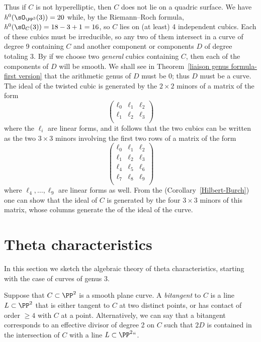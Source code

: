Thus if $C$ is not hyperelliptic, then $C$ does not lie on a quadric
surface. We have $h^0(\sO_{\PP^3}(3)) = 20$ while, by the Riemann--Roch
formula, $h^0(\sO_C(3)) = 18-3+1= 16$, so $C$ lies on (at least) 4
independent cubics. Each of these cubics must be irreducible, so any
two of them
intersect in a curve of degree 9 containing $C$ and another component
or components $D$ of degree totaling 3. By
%
if we choose two \emph{general} cubics containing $C$, then each of the
components of $D$ will be smooth. We shall see in
Theorem~\ref{liaison genus formula-first version}
that the arithmetic genus of $D$ must be 0;
thus $D$ must be a
%
 curve. The ideal of the twisted cubic
is generated by the $2\times 2$ minors of a matrix of the form
$$
\begin{pmatrix}
 \ell_0& \ell_1&\ell_2\\
 \ell_1& \ell_2&\ell_3\\
\end{pmatrix}
$$
where the $\ell_i$ are linear forms,
and it follows that the two cubics can be written as the two $3\times 3$
minors involving the first two rows of  a matrix of the form
$$
\begin{pmatrix}
\label{hilbert-burch matrix}
 \ell_0& \ell_1&\ell_2\\
 \ell_1& \ell_2&\ell_3\\
\ell_4& \ell_5&\ell_6\\
 \ell_7& \ell_8&\ell_9\\
\end{pmatrix}
$$
where $\ell_4,\dots,\ell_9$ are linear forms as well.
From the
%
(Corollary~\ref{Hilbert-Burch}) one can
show that the ideal of $C$ is generated by the four $3\times 3$ minors
of this matrix, whose columns generate
the
%
of the ideal of the curve.

\section{Theta characteristics}

In this section we sketch the algebraic theory of theta characteristics,
%
starting with the case of curves of genus 3.

Suppose that $C \subset \PP^2$ is a smooth plane curve. A \emph{bitangent}
%
to $C$ is a line $L \subset \PP^2$ that is either tangent to $C$ at
two distinct points, or has contact of order $\geq 4$ with $C$ at a
point. Alternatively, we can say that a bitangent  corresponds to an
effective divisor of degree 2 on $C$ such that $2D$ is contained in the
intersection of $C$ with a line $L \subset \PP^2` `$.

